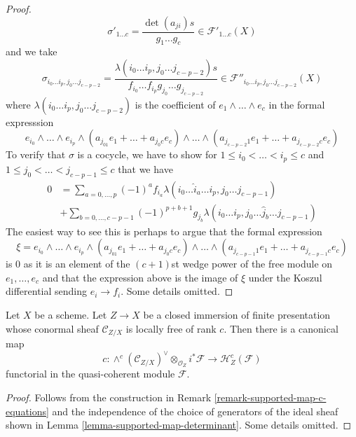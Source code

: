 \begin{proof}
$$\sigma'_{1 \ldots c} = \frac{\det(a_{ji})s}{g_1 \ldots g_c} \in
\mathcal{F}'_{1 \ldots c}(X)
$$
and we take
$$
\sigma_{i_0 \ldots i_p, j_0 \ldots j_{c - p - 2}} =
\frac{\lambda(i_0 \ldots i_p, j_0 \ldots j_{c - p - 2})s}%
{f_{i_0} \ldots f_{i_p}g_{j_0} \ldots g_{j_{c - p - 2}}}
\in \mathcal{F}''_{i_0 \ldots i_p, j_0 \ldots j_{c - p - 2}}(X)
$$
where $\lambda(i_0 \ldots i_p, j_0 \ldots j_{c - p - 2})$
is the coefficient of $e_1 \wedge \ldots \wedge e_c$ in
the formal expresssion
$$
e_{i_0} \wedge \ldots \wedge e_{i_p} \wedge
(a_{j_01} e_1 + \ldots + a_{j_0c}e_c) \wedge \ldots \wedge
(a_{j_{c - p - 2}1} e_1 + \ldots + a_{j_{c - p - 2}c}e_c)
$$
To verify that $\sigma$ is a cocycle, we have to show for
$1 \leq i_0 < \ldots < i_p \leq c$ and
$1 \leq j_0 < \ldots < j_{c - p - 1} \leq c$
that we have
\begin{align*}
0 & =
\sum\nolimits_{a = 0, \ldots, p} (-1)^a
f_{i_a} \lambda(i_0 \ldots \hat i_a \ldots i_p, j_0 \ldots j_{c - p - 1}) \\
& +
\sum\nolimits_{b = 0, \ldots, c - p - 1} (-1)^{p + b + 1}g_{j_b}
\lambda(i_0 \ldots i_p, j_0 \ldots \hat j_b \ldots j_{c - p - 1})
\end{align*}
The easiest way to see this is perhaps to argue that the formal expression
$$
\xi = e_{i_0} \wedge \ldots \wedge e_{i_p} \wedge
(a_{j_01} e_1 + \ldots + a_{j_0c}e_c) \wedge \ldots \wedge
(a_{j_{c - p - 1}1} e_1 + \ldots + a_{j_{c - p - 1}c}e_c)
$$
is $0$ as it is an element of the $(c + 1)$st wedge power of the free module
on $e_1, \ldots, e_c$ and that the expression above is the image of
$\xi$ under the Koszul differential sending $e_i \to f_i$. Some details
omitted.
\end{proof}

\begin{lemma}
\label{lemma-supported-map-global}
Let $X$ be a scheme. Let $Z \to X$ be a closed immersion of finite presentation
whose conormal sheaf $\mathcal{C}_{Z/X}$ is locally free of rank $c$.
Then there is a canonical map
$$
c :
\wedge^c(\mathcal{C}_{Z/X})^\vee \otimes_{\mathcal{O}_Z} i^*\mathcal{F}
\longrightarrow
\mathcal{H}_Z^c(\mathcal{F})
$$
functorial in the quasi-coherent module $\mathcal{F}$.
\end{lemma}

\begin{proof}
Follows from the construction in
Remark \ref{remark-supported-map-c-equations}
and the independence of the choice
of generators of the ideal sheaf shown in
Lemma \ref{lemma-supported-map-determinant}.
Some details omitted.
\end{proof}


